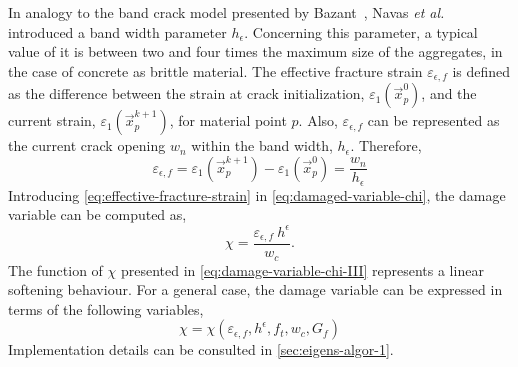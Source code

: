 \message{ !name(2020_EFM_MPM_Eigensoftening.tex)}\documentclass[preprint,12pt,a4paper]{elsarticle}
\begin{document}
In analogy to the band crack model presented by
Bazant~\cite{Bazant83}, Navas {\it et al.} \cite{Navas_2018_ES}
\cite{Navas_2017_ES} introduced a band width parameter $h_{\epsilon}$.
Concerning this parameter, a typical value of it is between two and
four times the maximum size of the aggregates, in the case of
concrete as brittle material. The effective fracture strain
$\varepsilon_{\epsilon,f}$ is defined as the difference between the strain at crack initialization,
$\varepsilon_1(\vec{x}_p^{0})$, and the current strain, $\varepsilon_1(\vec{x}_p^{k+1})$, for material point $p$. Also,
$\varepsilon_{\epsilon,f}$ can be represented as the current crack
opening $w_n$ within the band width, $h_{\epsilon}$. Therefore, 
\begin{equation}
  \label{eq:effective-fracture-strain}
  \varepsilon_{\epsilon,f} = \varepsilon_1(\vec{x}_p^{k+1}) -
  \varepsilon_1(\vec{x}_p^{0}) = \frac{w_n}{h_{\epsilon}}
\end{equation}
Introducing \eqref{eq:effective-fracture-strain} in
\eqref{eq:damaged-variable-chi}, the damage variable can be computed
as,
\begin{equation}
  \label{eq:damage-variable-chi-II}
\chi = \frac{\varepsilon_{\epsilon,f}\ h^{\epsilon}}{w_c}.  
\end{equation}
The function of $\chi$ presented in \eqref{eq:damage-variable-chi-III}
represents a linear softening behaviour. For a general case, the
damage variable can be expressed in terms of the following variables,
\begin{equation}
  \label{eq:damage-variable-chi-III}
  \chi = \chi(\varepsilon_{\epsilon,f}, h^{\epsilon}, f_t, w_c, G_f)
\end{equation}
Implementation details can be consulted in \ref{sec:eigens-algor-1}.
\end{document}
